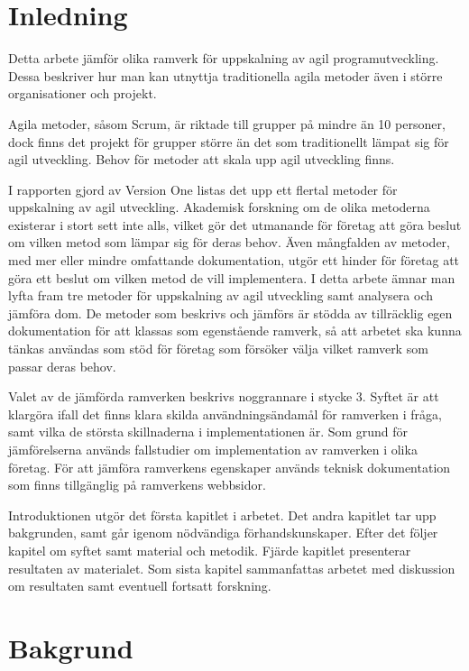 \section{Inledning}
	
	Detta arbete jämför olika ramverk för uppskalning av agil programutveckling. Dessa beskriver hur man kan utnyttja traditionella agila metoder även i större organisationer och projekt. 
	
	Agila metoder, såsom Scrum, är riktade till grupper på mindre än 10 personer\cite{scrum_guide}, dock finns det projekt för grupper större än det som traditionellt lämpat sig för agil utveckling.
	Behov för metoder att skala upp agil utveckling finns.
	
	I rapporten gjord av Version One \cite{version_one_report} listas det upp ett flertal metoder för uppskalning av agil utveckling. Akademisk forskning om de olika metoderna existerar i stort sett inte alls, vilket gör det utmanande för företag att göra beslut om vilken metod som lämpar sig för deras behov. Även mångfalden av metoder, med mer eller mindre omfattande dokumentation, utgör ett hinder för företag att göra ett beslut om vilken metod de vill implementera. 	
	I detta arbete ämnar man lyfta fram tre metoder för uppskalning av agil utveckling samt analysera och jämföra dom.
	De metoder som beskrivs och jämförs är stödda av tillräcklig egen dokumentation för att klassas som egenstående ramverk, så att arbetet ska kunna tänkas användas som stöd för företag som försöker välja vilket ramverk som passar deras behov.	
	
	Valet av de jämförda ramverken beskrivs noggrannare i stycke 3.
	Syftet är att klargöra ifall det finns klara skilda användningsändamål för ramverken i fråga, samt vilka de största skillnaderna i implementationen är. Som grund för jämförelserna används fallstudier om implementation av ramverken i olika företag. För att jämföra ramverkens egenskaper används teknisk dokumentation som finns tillgänglig på ramverkens webbsidor.
	
	Introduktionen utgör det första kapitlet i arbetet. Det andra kapitlet tar upp bakgrunden, samt går igenom nödvändiga förhandskunskaper. Efter det följer kapitel om syftet samt material och metodik. Fjärde kapitlet presenterar resultaten av materialet. Som sista kapitel sammanfattas arbetet med diskussion om resultaten samt eventuell fortsatt forskning.
	
	
\newpage
\section{Bakgrund}
	
